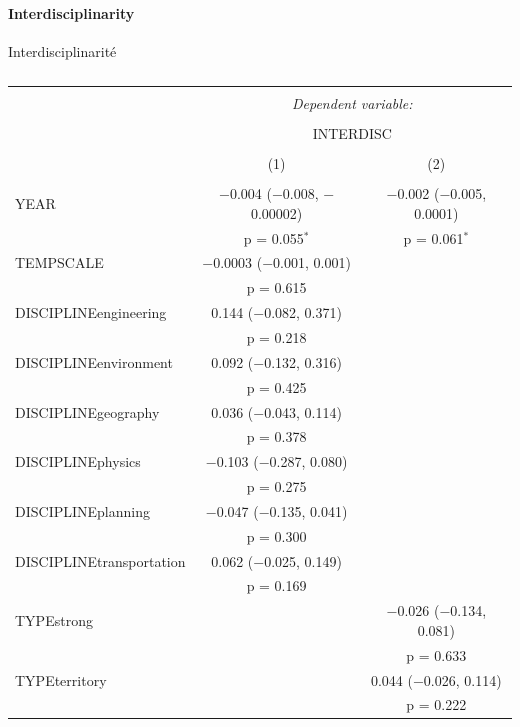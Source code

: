 \paragraph{Interdisciplinarity}{Interdisciplinarité}




\begin{table}[!htbp] \centering 
  \caption{} 
  \label{} 
\begin{tabular}{@{\extracolsep{5pt}}lcc} 
\\[-1.8ex]\hline 
\hline \\[-1.8ex] 
 & \multicolumn{2}{c}{\textit{Dependent variable:}} \\ 
\cline{2-3} 
\\[-1.8ex] & \multicolumn{2}{c}{INTERDISC} \\ 
\\[-1.8ex] & (1) & (2)\\ 
\hline \\[-1.8ex] 
 YEAR & $-$0.004 ($-$0.008, $-$0.00002) & $-$0.002 ($-$0.005, 0.0001) \\ 
  & p = 0.055$^{*}$ & p = 0.061$^{*}$ \\ 
  TEMPSCALE & $-$0.0003 ($-$0.001, 0.001) &  \\ 
  & p = 0.615 &  \\ 
  DISCIPLINEengineering & 0.144 ($-$0.082, 0.371) &  \\ 
  & p = 0.218 &  \\ 
  DISCIPLINEenvironment & 0.092 ($-$0.132, 0.316) &  \\ 
  & p = 0.425 &  \\ 
  DISCIPLINEgeography & 0.036 ($-$0.043, 0.114) &  \\ 
  & p = 0.378 &  \\ 
  DISCIPLINEphysics & $-$0.103 ($-$0.287, 0.080) &  \\ 
  & p = 0.275 &  \\ 
  DISCIPLINEplanning & $-$0.047 ($-$0.135, 0.041) &  \\ 
  & p = 0.300 &  \\ 
  DISCIPLINEtransportation & 0.062 ($-$0.025, 0.149) &  \\ 
  & p = 0.169 &  \\ 
  TYPEstrong &  & $-$0.026 ($-$0.134, 0.081) \\ 
  &  & p = 0.633 \\ 
  TYPEterritory &  & 0.044 ($-$0.026, 0.114) \\ 
  &  & p = 0.222 \\ 

\end{tabular}
\end{table}
